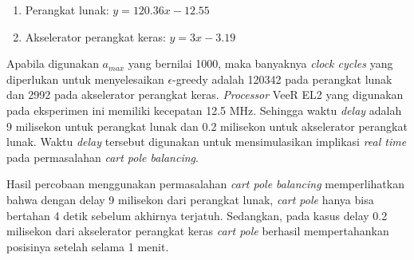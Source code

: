 \begin{enumerate}
	\item Perangkat lunak: $y = 120.36x - 12.55$
	\item Akselerator perangkat keras: $y = 3x - 3.19$
\end{enumerate}

Apabila digunakan $a_{max}$ yang bernilai 1000, maka banyaknya \textit{clock cycles} yang diperlukan untuk menyelesaikan $\epsilon$-greedy adalah 120342 pada perangkat lunak dan 2992 pada akselerator perangkat keras. \textit{Processor} VeeR EL2 yang digunakan pada eksperimen ini memiliki kecepatan 12.5 MHz. Sehingga waktu \textit{delay} adalah 9 milisekon untuk perangkat lunak dan 0.2 milisekon untuk akselerator perangkat lunak. Waktu \textit{delay} tersebut digunakan untuk mensimulasikan implikasi \textit{real time} pada permasalahan \textit{cart pole balancing}.

Hasil percobaan menggunakan permasalahan \textit{cart pole balancing} memperlihatkan bahwa dengan delay 9 milisekon dari perangkat lunak, \textit{cart pole} hanya bisa bertahan 4 detik sebelum akhirnya terjatuh. Sedangkan, pada kasus delay 0.2 milisekon dari akselerator perangkat keras \textit{cart pole} berhasil mempertahankan posisinya setelah selama 1 menit.
